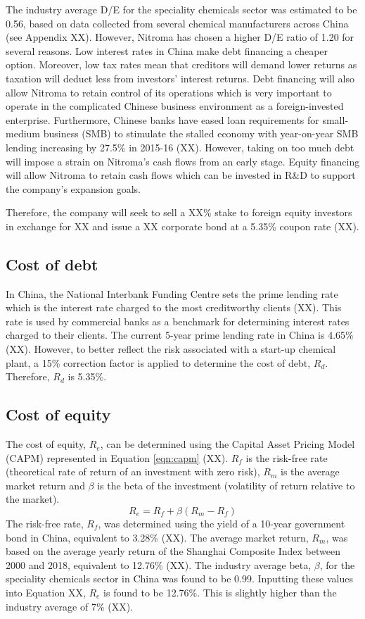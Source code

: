 The industry average D/E for the speciality chemicals sector was estimated to be 0.56, based on data collected from several chemical manufacturers across China (see Appendix XX). However, Nitroma has chosen a higher D/E ratio of 1.20 for several reasons. Low interest rates in China make debt financing a cheaper option. Moreover, low tax rates mean that creditors will demand lower returns as taxation will deduct less from investors’ interest returns. Debt financing will also allow Nitroma to retain control of its operations which is very important to operate in the complicated Chinese business environment as a foreign-invested enterprise. Furthermore, Chinese banks have eased loan requirements for small-medium business (SMB) to stimulate the stalled economy with year-on-year SMB lending increasing by 27.5\% in 2015-16 (XX). However, taking on too much debt will impose a strain on Nitroma’s cash flows from an early stage. Equity financing will allow Nitroma to retain cash flows which can be invested in R\&D to support the company’s expansion goals.

Therefore, the company will seek to sell a XX\% stake to foreign equity investors in exchange for XX and issue a XX corporate bond at a 5.35\% coupon rate (XX).

\subsection{Cost of debt}
\label{sec:debt}
In China, the National Interbank Funding Centre sets the prime lending rate which is the interest rate charged to the most creditworthy clients (XX). This rate is used by commercial banks as a benchmark for determining interest rates charged to their clients. The current 5-year prime lending rate in China is 4.65\% (XX). However, to better reflect the risk associated with a start-up chemical plant, a 15\% correction factor is applied to determine the cost of debt, $R_{d}$. Therefore, $R_{d}$ is 5.35\%.

\subsection{Cost of equity}
\label{sec:equity}
The cost of equity, $R_{e}$, can be determined using the Capital Asset Pricing Model (CAPM) represented in Equation \ref{eqn:capm} (XX). $R_{f}$ is the risk-free rate (theoretical rate of return of an investment with zero risk), $R_{m}$ is the average market return and $\beta$ is the beta of the investment (volatility of return relative to the market).
\begin{equation}
\label{eqn:capm}
    R_{e}=R_{f}+\beta(R_{m}-R_{f})
\end{equation}
The risk-free rate, $R_{f}$, was determined using the yield of a 10-year government bond in China, equivalent to 3.28\% (XX). The average market return, $R_{m}$, was based on the average yearly return of the Shanghai Composite Index between 2000 and 2018, equivalent to 12.76\% (XX). The industry average beta, $\beta$, for the speciality chemicals sector in China was found to be 0.99. Inputting these values into Equation XX, $R_{e}$ is found to be 12.76\%. This is slightly higher than the industry average of 7\% (XX).

